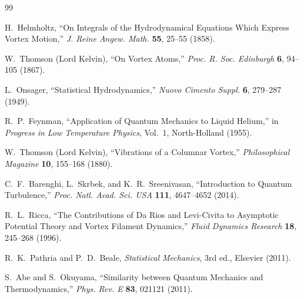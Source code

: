 \documentclass[pdflatex,sn-mathphys-num]{sn-jnl}
\begin{document}
            \begin{thebibliography}{99}

                H.~Helmholtz,
                ``On Integrals of the Hydrodynamical Equations Which Express Vortex Motion,''
                \emph{J. Reine Angew. Math.} \textbf{55}, 25--55 (1858).

                W.~Thomson (Lord Kelvin),
                ``On Vortex Atoms,''
                \emph{Proc. R. Soc. Edinburgh} \textbf{6}, 94--105 (1867).

                L.~Onsager,
                ``Statistical Hydrodynamics,''
                \emph{Nuovo Cimento Suppl.} \textbf{6}, 279--287 (1949).

                R.~P.~Feynman,
                ``Application of Quantum Mechanics to Liquid Helium,''
                in \emph{Progress in Low Temperature Physics}, Vol.~1,
                North-Holland (1955).

                W.~Thomson (Lord Kelvin),
                ``Vibrations of a Columnar Vortex,''
                \emph{Philosophical Magazine} \textbf{10}, 155--168 (1880).

                C.~F.~Barenghi, L.~Skrbek, and K.~R.~Sreenivasan,
                ``Introduction to Quantum Turbulence,''
                \emph{Proc. Natl. Acad. Sci. USA} \textbf{111}, 4647--4652 (2014).

                R.~L.~Ricca,
                ``The Contributions of Da Rios and Levi-Civita to Asymptotic Potential Theory and Vortex Filament Dynamics,''
                \emph{Fluid Dynamics Research} \textbf{18}, 245--268 (1996).

                R.~K.~Pathria and P.~D.~Beale,
                \emph{Statistical Mechanics}, 3rd ed.,
                Elsevier (2011).

                S.~Abe and S.~Okuyama,
                ``Similarity between Quantum Mechanics and Thermodynamics,''
                \emph{Phys. Rev. E} \textbf{83}, 021121 (2011).


\end{thebibliography}
\end{document}
